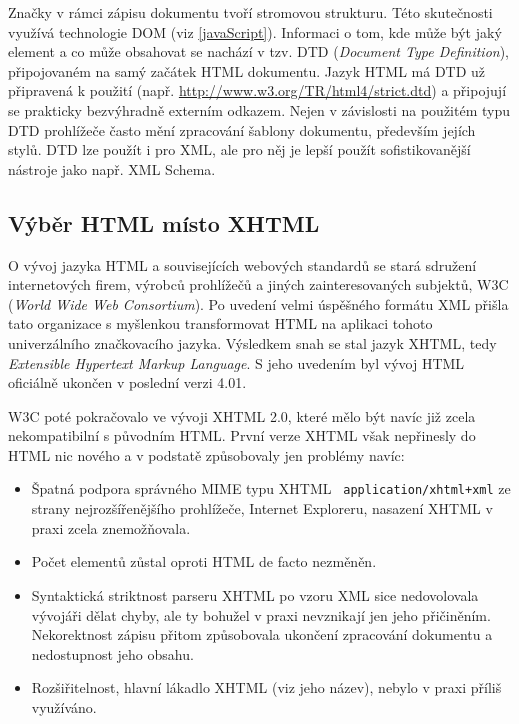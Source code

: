 Značky v rámci zápisu dokumentu tvoří stromovou strukturu. Této
skutečnosti využívá technologie DOM (viz \ref{javaScript}). Informaci
o tom, kde může být jaký element a co může obsahovat se nachází v
tzv. DTD ({\it Document Type Definition}), připojovaném na samý
začátek HTML dokumentu. Jazyk HTML má DTD už připravená k použití
(např. \url{http://www.w3.org/TR/html4/strict.dtd}) a připojují se
prakticky bezvýhradně externím odkazem. Nejen v závislosti na
použitém typu DTD prohlížeče často mění zpracování šablony dokumentu,
především jejích stylů. DTD lze použít i pro XML, ale pro něj je lepší
použít sofistikovanější nástroje jako např. XML Schema. 

\subsection{Výběr HTML místo XHTML}
O vývoj jazyka HTML a souvisejících webových standardů se stará
sdružení internetových firem, výrobců prohlížečů a jiných
zainteresovaných subjektů, W3C ({\it World Wide Web Consortium}). Po
uvedení velmi úspěšného formátu XML přišla tato organizace s
myšlenkou transformovat HTML na aplikaci tohoto univerzálního
značkovacího jazyka. Výsledkem snah se stal jazyk XHTML, tedy {\it
Extensible Hypertext Markup Language}. S jeho uvedením byl vývoj 
 HTML oficiálně ukončen v poslední verzi 4.01.

W3C poté pokračovalo ve vývoji XHTML 2.0, které mělo být navíc již
zcela nekompatibilní s původním HTML. První verze XHTML však
nepřinesly do HTML nic nového a v podstatě způsobovaly jen problémy navíc:

\begin{itemize}
	\item Špatná podpora správného MIME typu XHTML {\tt
	application/xhtml+xml} ze strany nejrozšířenějšího prohlížeče,
	Internet Exploreru, nasazení  XHTML v praxi zcela
	znemožňovala.
	\item Počet elementů zůstal oproti HTML de facto nezměněn.
	\item Syntaktická striktnost parseru XHTML po vzoru XML sice
	nedovolovala vývojáři dělat chyby, ale ty bohužel v praxi nevznikají
	jen jeho přičiněním. Nekorektnost zápisu přitom způsobovala ukončení
	zpracování dokumentu a nedostupnost jeho obsahu.
	\item Rozšiřitelnost, hlavní lákadlo XHTML (viz jeho název), nebylo
	v praxi příliš využíváno. 
\end{itemize}

